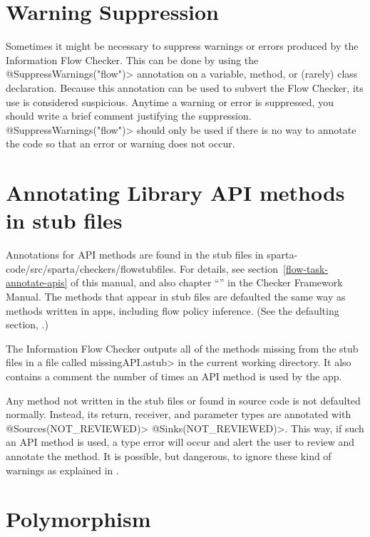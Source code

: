 \section{Warning Suppression\label{sec:waringsuppression}}
 
Sometimes it might be necessary to suppress warnings or errors produced by
the Information Flow Checker.  This can be done by using the
\<@SuppressWarnings("flow")> annotation on a variable, method, or (rarely)
class declaration.  Because this annotation can be used to subvert the Flow
Checker, its use is considered suspicious.  Anytime a warning or error is
suppressed, you should write a brief comment justifying the suppression.
\<@SuppressWarnings("flow")> should only be used if there is no way to
annotate the code so that an error or warning does not occur.  

\section{Annotating Library API methods in stub files\label{sec:apispecs}}

Annotations for API methods are found in the stub files in sparta-code/src/sparta/checkers/flowstubfiles.
For details, see section~\ref{flow-task-annotate-apis} of this manual, and also 
chapter
``'' in the Checker Framework Manual.  
 The methods that appear in stub files are defaulted the same way as methods 
written in apps, including flow policy inference.  
(See the defaulting section, .) 

  The Information Flow Checker  outputs all of the methods missing from the stub files in
  a file called \<missingAPI.astub> in the current working directory. It also 
  contains a comment the number of times an API method is used by the app.

Any method not written in the stub files or found in source code is not defaulted normally. 
 Instead, its return, receiver, and parameter types are annotated with \<@Sources(NOT\_REVIEWED)> 
 \<@Sinks(NOT\_REVIEWED)>. 
 This way, if such an API method is used, a type error
  will occur and alert the user to review and annotate the method. It is possible, but dangerous, to ignore these kind of warnings as explained in .


\section{Polymorphism \label{sec:polyflowsources}}


